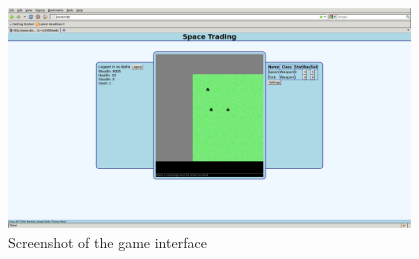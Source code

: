 \documentclass[12pt]{amsart}
\begin{document}
\begin{figure}[h]
\begin{center}
\includegraphics[width = 0.95\textwidth]{screeny}
\caption{Screenshot of the game interface}
\end{center}
\end{figure}
\end{document}
